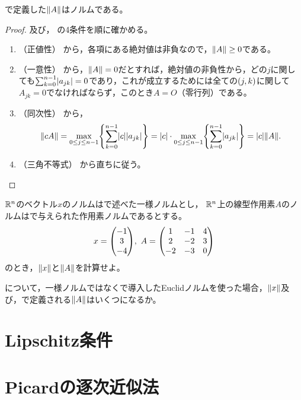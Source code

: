 \documentclass[b5paper,oneside,openany]{ltjsbook} %
\begin{document}
\begin{prop}
    で定義した$\norm{A}$はノルムである。
    \begin{proof}
        及び，
        の4条件を順に確かめる。
        \begin{enumerate}[label=(\roman*)]
            \item （正値性）
            から，各項にある絶対値は非負なので，$\norm{A} \geq 0$である。

            \item （一意性）
            から，$\norm{A}=0$だとすれば，絶対値の非負性から，どの$j$に関しても$\sum_{k=0}^{n-1}\abs{a_{jk}}=0$であり，これが成立するためには全ての$\pare{j,k}$に関して$A_{jk}=0$でなければならず，このとき$A=O$（零行列）である。

            \item （同次性）
            から，
            \begin{equation}
                \norm{cA}=\max_{0\leq j\leq n-1} \bra{\sum_{k=0}^{n-1} \abs{c}\abs{a_{jk}}}=\abs{c}\cdot \max_{0\leq j\leq n-1} \bra{\sum_{k=0}^{n-1} \abs{a_{jk}}}=\abs{c}\norm{A}.
            \end{equation}

            \item （三角不等式）
            から直ちに従う。
        \end{enumerate}
    \end{proof}
\end{prop}

\begin{prob}
    $\mathbb{R}^n$のベクトル$x$のノルムはで述べた一様ノルムとし，
    $\mathbb{R}^n$上の線型作用素$A$のノルムはで与えられた作用素ノルムであるとする。
    \begin{equation}
        x=\vctr{-1\\3\\-4},\
        A=\pmat{1 & -1 & 4\\
            2 & -2 & 3\\
            -2 & -3 & 0
            }
    \end{equation}
    のとき，$\norm{x}$と$\norm{A}$を計算せよ。
\end{prob}

\begin{prob}
    について，一様ノルムではなくで導入したEuclidノルムを使った場合，$\norm{x}$及び，で定義される$\norm{A}$はいくつになるか。
\end{prob}

\section{Lipschitz条件}


\section{Picardの逐次近似法}
\end{document}
